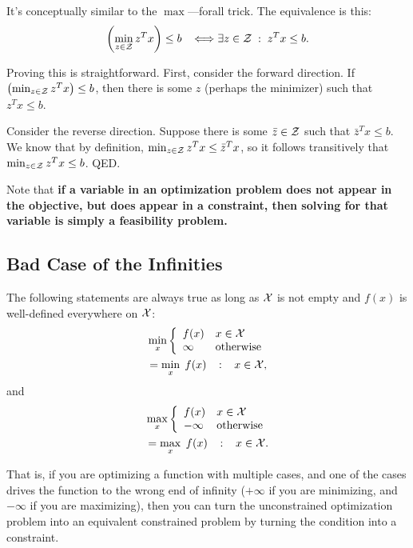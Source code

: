 \documentclass[12pt]{article}
\begin{document}
It's conceptually similar to the $\max$---forall trick. The equivalence is this:
%
\begin{equation*}
\left(\min_{z \in {\mathcal Z}} z^T x \right) \leq b\;\;\; \Longleftrightarrow \exists z \in {\mathcal Z} \; : \; z^T x \leq b.
\end{equation*}

Proving this is straightforward. First, consider the forward direction. If $\left(\min_{z \in {\mathcal Z}} z^T x \right) \leq b$, then there is some $z$ (perhaps the minimizer) such that $z^T x \leq b$. 

Consider the reverse direction. Suppose there is some $\bar{z} \in {\mathcal Z} $ such that $\bar{z}^T x \leq b$. We know that by definition, $\min_{z \in {\mathcal Z}} z^T x \leq \bar{z}^T x$, so it follows transitively that $\min_{z \in {\mathcal Z}} z^T x \leq b$. QED. 

Note that \textbf{if a variable in an optimization problem does not appear in the objective, but does appear in a constraint, then solving for that variable is simply a feasibility problem.}


\subsection{Bad Case of the Infinities}

The following statements are always true as long as ${\mathcal X}$ is not empty and $f(x)$ is well-defined everywhere on ${\mathcal X}$:
%
\begin{align*}
&\min_x \left\{ \begin{array}{ll}
f(x) & x \in {\mathcal X} \\
\infty & \text{otherwise}
\end{array} \right.\\
&= \min_x \; f(x) \;\;\; : \;\;\; x \in {\mathcal X},
\end{align*}  
%
and
%
\begin{align*}
&\max_x \left\{ \begin{array}{ll}
f(x) & x \in {\mathcal X} \\
-\infty & \text{otherwise}
\end{array} \right.\\
&= \max_x \; f(x) \;\;\; : \;\;\; x \in {\mathcal X}.
\end{align*}  


That is, if you are optimizing a function with multiple cases, and one of the cases drives the function to the wrong end of infinity ($+\infty$ if you are minimizing, and $-\infty$ if you are maximizing), then you can turn the unconstrained optimization problem into an equivalent constrained problem by turning the condition into a constraint. 
\end{document}
